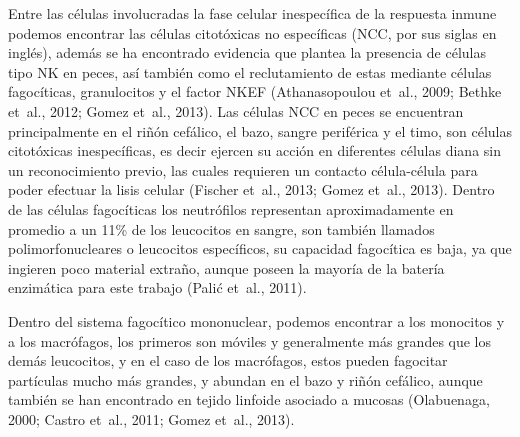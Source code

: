 \documentclass[12pt,letterpaper,oneside]{scrbook}
\begin{document}
Entre las células involucradas la fase celular inespecífica de la
respuesta inmune podemos encontrar las células citotóxicas no
específicas (NCC, por sus siglas en inglés), además se ha encontrado
evidencia que plantea la presencia de células tipo NK en peces, así
también como el reclutamiento de estas mediante células fagocíticas,
granulocitos y el factor NKEF (Athanasopoulou et~al., 2009; Bethke
et~al., 2012; Gomez et~al., 2013). Las células NCC en peces se
encuentran principalmente en el riñón cefálico, el bazo, sangre
periférica y el timo, son células citotóxicas inespecíficas, es decir
ejercen su acción en diferentes células diana sin un reconocimiento
previo, las cuales requieren un contacto célula-célula para poder
efectuar la lisis celular (Fischer et~al., 2013; Gomez et~al., 2013).
Dentro de las células fagocíticas los neutrófilos representan
aproximadamente en promedio a un 11\% de los leucocitos en sangre, son
también llamados polimorfonucleares o leucocitos específicos, su
capacidad fagocítica es baja, ya que ingieren poco material extraño,
aunque poseen la mayoría de la batería enzimática para este trabajo
(Palić et~al., 2011).

Dentro del sistema fagocítico mononuclear, podemos encontrar a los
monocitos y a los macrófagos, los primeros son móviles y generalmente
más grandes que los demás leucocitos, y en el caso de los macrófagos,
estos pueden fagocitar partículas mucho más grandes, y abundan en el
bazo y riñón cefálico, aunque también se han encontrado en tejido
linfoide asociado a mucosas (Olabuenaga, 2000; Castro et~al., 2011;
Gomez et~al., 2013).
\end{document}
